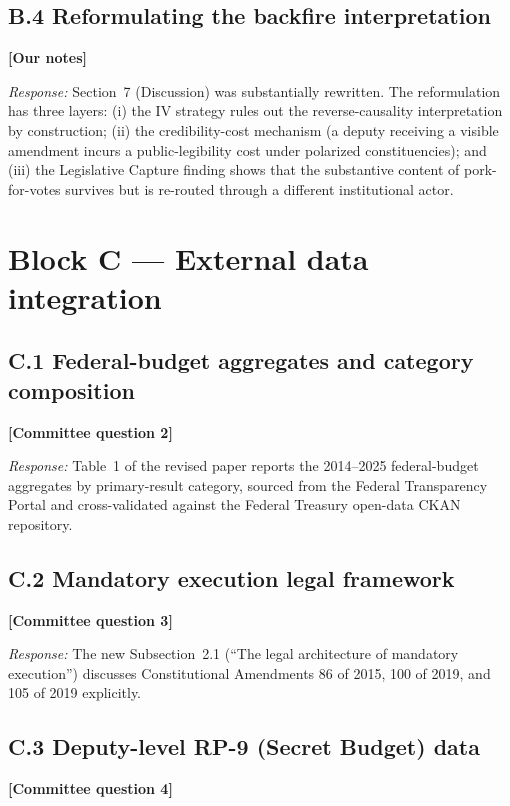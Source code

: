 \documentclass[11pt]{article}
\newcommand{\committee}[1]{\textbf{[#1]}}
\begin{document}
\subsection*{B.4 \quad Reformulating the backfire interpretation}
\committee{Our notes}

\noindent\emph{Response:} Section~7 (Discussion) was substantially rewritten.
The reformulation has three layers: (i) the IV strategy rules out the
reverse-causality interpretation by construction; (ii) the
credibility-cost mechanism (a deputy receiving a visible amendment
incurs a public-legibility cost under polarized constituencies); and
(iii) the Legislative Capture finding shows that the substantive
content of pork-for-votes survives but is re-routed through a
different institutional actor.

\section{Block C — External data integration}

\subsection*{C.1 \quad Federal-budget aggregates and category composition}
\committee{Committee question 2}

\noindent\emph{Response:} Table~1 of the revised paper reports the
2014--2025 federal-budget aggregates by primary-result category,
sourced from the Federal Transparency Portal and cross-validated
against the Federal Treasury open-data CKAN repository.

\subsection*{C.2 \quad Mandatory execution legal framework}
\committee{Committee question 3}

\noindent\emph{Response:} The new Subsection~2.1 (``The legal architecture
of mandatory execution'') discusses Constitutional Amendments 86 of
2015, 100 of 2019, and 105 of 2019 explicitly.

\subsection*{C.3 \quad Deputy-level RP-9 (Secret Budget) data}
\committee{Committee question 4}
\end{document}
